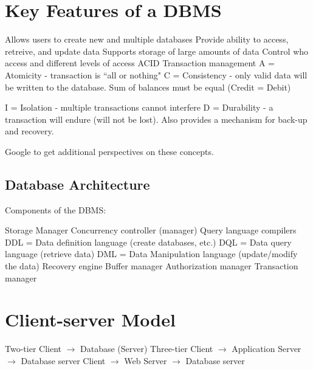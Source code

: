 \documentclass{article}
\begin{document}
\section*{Key Features of a DBMS}
 \begin{outline}[enumerate]
  \1 Allows users to create new and multiple databases
  \1 Provide ability to access, retreive, and update data
  \1 Supports storage of large amounts of data
  \1 Control who access and different levels of access
  \1 ACID Transaction management
        \2 A = Atomicity - transaction is ``all or nothing"
        \2 C  = Consistency - only valid data will be written to the database.  Sum of balances must be equal (Credit = Debit)
 
        \2 I = Isolation - multiple transactions cannot interfere
        \2 D = Durability - a transaction will endure (will not be lost).  Also provides a mechanism for back-up and recovery.

  \end{outline}
Google to get additional perspectives on these concepts.  




\subsection*{Database Architecture}
Components of the DBMS:

\begin{outline}
        \1 Storage Manager
        \1 Concurrency controller (manager)
        \1 Query language compilers
                \2 DDL = Data definition language (create databases, etc.)
                \2 DQL = Data query language (retrieve data)
                \2 DML  = Data Manipulation language (update/modify the data)
        \1 Recovery engine
        \1 Buffer manager
        \1 Authorization manager
        \1 Transaction manager
        
\end{outline}





\section*{Client-server Model}
\begin{outline}
        \1 Two-tier
                \2 Client $\to$ Database (Server)
         \1 Three-tier 
                \2 Client $\to$ Application Server $\to$ Database server
                \2 Client $\to$ Web Server $\to$ Database server
\end{outline}
\end{document}
